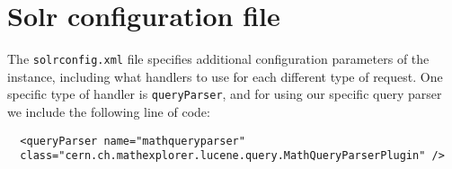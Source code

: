 \section{Solr configuration file}
The \verb|solrconfig.xml| file specifies additional configuration parameters of the instance, including what handlers to use for each different type of request. One specific type of handler is \verb|queryParser|, and for using our specific query parser we include the following line of code:

\begin{verbatim}
  <queryParser name="mathqueryparser" 
  class="cern.ch.mathexplorer.lucene.query.MathQueryParserPlugin" />
\end{verbatim}